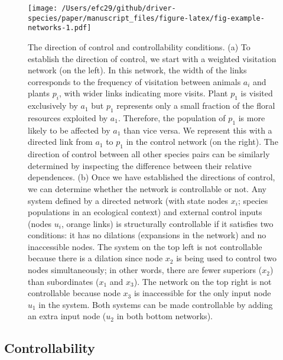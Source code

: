 \documentclass[a4paper]{artikel1}
\theoremstyle{definition}
\theoremstyle{definition}
\theoremstyle{definition}
\theoremstyle{remark}
\begin{document}
\begin{figure}
\centering
\texttt{[image: /Users/efc29/github/driver-species/paper/manuscript\_files/figure-latex/fig-example-networks-1.pdf]}
\caption{\label{fig:fig-example-networks}The direction of control and
controllability conditions. (a) To establish the direction of control,
we start with a weighted visitation network (on the left). In this
network, the width of the links corresponds to the frequency of
visitation between animals \(a_i\) and plants \(p_i\), with wider links
indicating more visits. Plant \(p_1\) is visited exclusively by \(a_1\)
but \(p_1\) represents only a small fraction of the floral resources
exploited by \(a_1\). Therefore, the population of \(p_1\) is more
likely to be affected by \(a_1\) than vice versa. We represent this with
a directed link from \(a_1\) to \(p_1\) in the control network (on the
right). The direction of control between all other species pairs can be
similarly determined by inspecting the difference between their relative
dependences. (b) Once we have established the directions of control, we
can determine whether the network is controllable or not. Any system
defined by a directed network (with state nodes \(x_i\); species
populations in an ecological context) and external control inputs (nodes
\(u_i\), orange links) is structurally controllable if it satisfies two
conditions: it has no dilations (expansions in the network) and no
inaccessible nodes. The system on the top left is not controllable
because there is a dilation since node \(x_2\) is being used to control
two nodes simultaneously; in other words, there are fewer superiors
(\(x_2\)) than subordinates (\(x_1\) and \(x_3\)). The network on the
top right is not controllable because node \(x_3\) is inaccessible for
the only input node \(u_1\) in the system. Both systems can be made
controllable by adding an extra input node (\(u_2\) in both bottom
networks).}
\end{figure}

\subsection{Controllability}\label{controllability}
\end{document}
